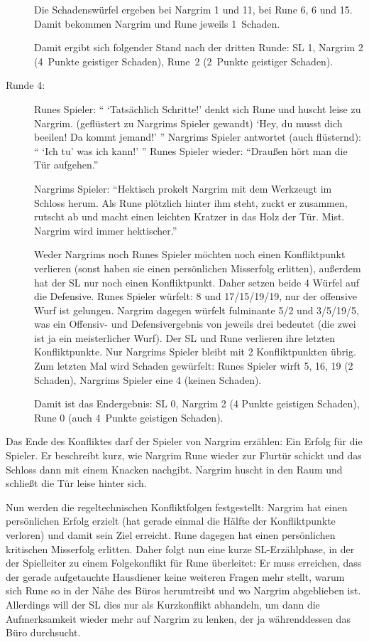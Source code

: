 \begin{beispiel}
\begin{description}
Die Schadenswürfel ergeben bei Nargrim 1 und 11, bei Rune 6, 6 und 15. Damit bekommen Nargrim und Rune jeweils 1~Schaden.

Damit ergibt sich folgender Stand nach der dritten Runde: SL 1, Nargrim 2 (4~Punkte geistiger Schaden), Rune~2 (2~Punkte geistiger Schaden).

\item[Runde 4:] 
Runes Spieler: `` `Tatsächlich Schritte!' denkt sich Rune und huscht leise zu Nargrim. (geflüstert zu Nargrims Spieler gewandt) `Hey, du musst dich beeilen! Da kommt jemand!' '' Nargrims Spieler antwortet (auch flüsternd): `` `Ich tu' was ich kann!' '' Runes Spieler wieder: ``Draußen hört man die Tür aufgehen.''

Nargrims Spieler: ``Hektisch prokelt Nargrim mit dem Werkzeugt im Schloss herum. Als Rune plötzlich hinter ihm steht, zuckt er zusammen, rutscht ab und macht einen leichten Kratzer in das Holz der Tür. Mist. Nargrim wird immer hektischer.''

Weder Nargrims noch Runes Spieler möchten noch einen Konfliktpunkt verlieren (sonst haben sie einen persönlichen Misserfolg erlitten), außerdem hat der SL nur noch einen Konfliktpunkt. Daher setzen beide 4 Würfel auf die Defensive. Runes Spieler würfelt: 8 und 17/15/19/19, nur der offensive Wurf ist gelungen. Nargrim dagegen würfelt fulminante 5/2 und 3/5/19/5, was ein Offensiv- und Defensivergebnis von jeweils drei bedeutet (die zwei ist ja ein meisterlicher Wurf). Der SL und Rune verlieren ihre letzten Konfliktpunkte. Nur Nargrims Spieler bleibt mit 2 Konfliktpunkten übrig.
Zum letzten Mal wird Schaden gewürfelt: Runes Spieler wirft 5, 16, 19 (2 Schaden), Nargrims Spieler eine 4 (keinen Schaden).

Damit ist das Endergebnis: SL 0, Nargrim 2 (4 Punkte geistigen Schaden), Rune 0 (auch 4~Punkte geistigen Schaden).
\end{description}

Das Ende des Konfliktes darf der Spieler von Nargrim erzählen: Ein Erfolg für die Spieler. Er beschreibt kurz, wie Nargrim Rune wieder zur Flurtür schickt und das Schloss dann mit einem Knacken nachgibt. Nargrim huscht in den Raum und schließt die Tür leise hinter sich.

Nun werden die regeltechnischen Konfliktfolgen festgestellt: Nargrim hat einen persönlichen Erfolg erzielt (hat gerade einmal die Hälfte der Konfliktpunkte verloren) und damit sein Ziel erreicht. Rune dagegen hat einen persönlichen kritischen Misserfolg erlitten. Daher folgt nun eine kurze SL-Erzählphase, in der der Spielleiter zu einem Folgekonflikt für Rune überleitet: Er muss erreichen, dass der gerade aufgetauchte Hausdiener keine weiteren Fragen mehr stellt, warum sich Rune so in der Nähe des Büros herumtreibt und wo Nargrim abgeblieben ist. Allerdings will der SL dies nur als Kurzkonflikt abhandeln, um dann die Aufmerksamkeit wieder mehr auf Nargrim zu lenken, der ja währenddessen das Büro durchsucht.
\end{beispiel}

